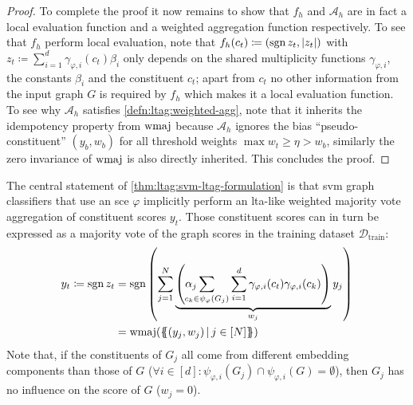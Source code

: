 \begin{proof}
	To complete the proof it now remains to show that $f_h$ and $\mathcal{A}_h$ are in fact a local evaluation function and a weighted aggregation function respectively.
	To see that $f_h$ perform local evaluation, note that $f_h(c_t) \coloneqq (\operatorname{sgn} z_t, {|z_t|})$ with $z_t \coloneqq \sum_{i=1}^{d} \gamma_{\varphi,i}(c_t) \beta_i$ only depends on the shared multiplicity functions $\gamma_{\varphi,i}$, the constants $\beta_i$ and the constituent $c_t$;
	apart from $c_t$ no other information from the input graph $G$ is required by $f_h$ which makes it a local evaluation function.
	To see why $\mathcal{A}_h$ satisfies \cref{defn:ltag:weighted-agg}, note that it inherits the idempotency property from $\operatorname{wmaj}$ because $\mathcal{A}_h$ ignores the bias ``pseudo-constituent'' $(y_b, w_b)$ for all threshold weights $\max w_t \geq \eta > w_b$, similarly the zero invariance of $\operatorname{wmaj}$ is also directly inherited.
	This concludes the proof.
\end{proof}

The central statement of \cref{thm:ltag:svm-ltag-formulation} is that \acs{svm} graph classifiers that use an \ac{sce} $\varphi$ implicitly perform an \acs{lta}-like weighted majority vote aggregation of constituent scores $y_t$.
Those constituent scores can in turn be expressed as a majority vote of the graph scores in the training dataset $\mathcal{D}_{\text{train}}$:
\begin{align}
	y_t \coloneqq \sgn z_t
	 &= \sgn\left( \sum_{j=1}^N \underbrace{\left( \alpha_j \smashoperator[l]{\sum_{c_k \in \psi_{\varphi}(G_j)}} \sum_{i=1}^d \gamma_{\varphi,i}(c_t) \gamma_{\varphi,i}(c_k) \right)}_{w_j} y_j \right) \\
	 &= \wmaj(\ldblbrace (y_j, w_j)\, |\, j \in [N] \rdblbrace) \nonumber
\end{align}
Note that, if the constituents of $G_j$ all come from different embedding components than those of $G$ ($\forall i \in [d]: {\psi_{\varphi, i}(G_j) \cap \psi_{\varphi, i}(G)} = \emptyset$), then $G_j$ has no influence on the score of $G$ ($w_j = 0$).

